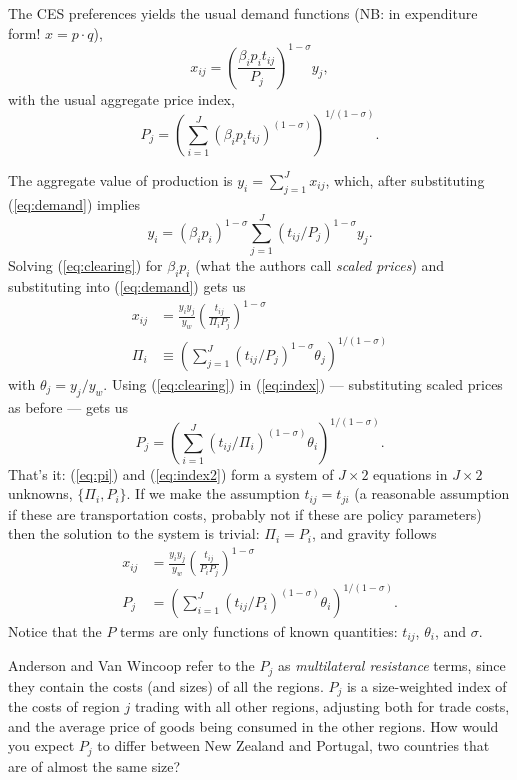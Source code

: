 \documentclass[11pt, pdftex]{article}
\begin{document}
The CES preferences yields the usual demand functions (NB: in expenditure form! $x=p\cdot q$),
\begin{equation}
\label{eq:demand}
x_{ij}=\left(\frac{\beta_ip_it_{ij}}{P_j}\right)^{1-\sigma}y_j,
\end{equation}
with the usual aggregate price index,
\begin{equation}
\label{eq:index}
P_{j}=\left(\sum_{i=1}^J (\beta_ip_it_{ij})^{(1-\sigma)} \right)^{1/(1-\sigma)}.
\end{equation}

The aggregate value of production is $y_i=\sum_{j=1}^Jx_{ij}$, which, after substituting (\ref{eq:demand}) implies
\begin{equation}
\label{eq:clearing}
y_i=(\beta_ip_i)^{1-\sigma} \sum_{j=1}^J(t_{ij}/P_j)^{1-\sigma}y_j.
\end{equation}
Solving (\ref{eq:clearing}) for $\beta_ip_i$ (what the authors call \textit{scaled prices}) and substituting into (\ref{eq:demand}) gets us
\begin{align}
x_{ij}&=\frac{y_iy_j}{y_w}\left(\frac{t_{ij}}{\Pi_iP_j} \right)^{1-\sigma}\\
\Pi_i &\equiv \left(\sum_{j=1}^J(t_{ij}/P_j)^{1-\sigma}\theta_j\right)^{1/(1-\sigma)} \label{eq:pi}
\end{align}
with $\theta_j=y_j/y_w$. Using (\ref{eq:clearing}) in (\ref{eq:index}) --- substituting scaled prices as before --- gets us
\begin{equation}
\label{eq:index2}
P_{j}=\left(\sum_{i=1}^J (t_{ij}/\Pi_i)^{(1-\sigma)}\theta_i \right)^{1/(1-\sigma)}.
\end{equation}
That's it: (\ref{eq:pi}) and (\ref{eq:index2}) form a system of $J\times2$ equations in $J\times2$ unknowns, $\{\Pi_i, P_i\}$. If we make the assumption $t_{ij}=t_{ji}$ (a reasonable assumption if these are transportation costs, probably not if these are policy parameters) then the solution to the system is trivial: $\Pi_i=P_i$, and gravity follows
\begin{align}
x_{ij}&=\frac{y_iy_j}{y_w}\left(\frac{t_{ij}}{P_iP_j} \right)^{1-\sigma} \label{eq:gravityEquil}\\
P_{j}&=\left(\sum_{i=1}^J (t_{ij}/P_i)^{(1-\sigma)}\theta_i \right)^{1/(1-\sigma)} \label{eq:p-equil}.
\end{align}
Notice that the $P$ terms are only functions of known quantities: $t_{ij}$, $\theta_i$, and $\sigma$. 


Anderson and Van Wincoop refer to the $P_j$ as \textit{multilateral resistance} terms, since they contain the costs (and sizes) of all the regions. $P_j$ is a size-weighted index of the costs of region $j$ trading with all other regions, adjusting both for trade costs, and the average price of goods being consumed in the other regions.  How would you expect $P_j$ to differ between New Zealand and Portugal, two countries that are of almost the same size?
\end{document}
